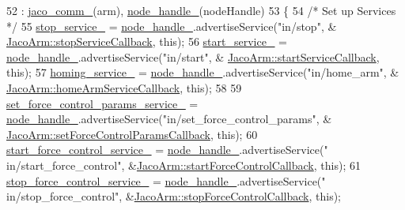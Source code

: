 \begin{DoxyCode}
52     : \hyperlink{classjaco_1_1JacoArm_a2f9cbba855994058b82c0f4628349286}{jaco\_comm\_}(arm), \hyperlink{classjaco_1_1JacoArm_aa8b6a99580f2ccf8a5c509cc0f3b3c8e}{node\_handle\_}(nodeHandle)
53 \{
54     \textcolor{comment}{/* Set up Services */}
55     \hyperlink{classjaco_1_1JacoArm_a43eca41486bfa5f012085d3bb02ac7ca}{stop\_service\_} = \hyperlink{classjaco_1_1JacoArm_aa8b6a99580f2ccf8a5c509cc0f3b3c8e}{node\_handle\_}.advertiseService(\textcolor{stringliteral}{"in/stop"}, &
      \hyperlink{classjaco_1_1JacoArm_a14ddcea579804fbbd3fb11643bc91e78}{JacoArm::stopServiceCallback}, \textcolor{keyword}{this});
56     \hyperlink{classjaco_1_1JacoArm_a7003937a11db04de838d05de05d29481}{start\_service\_} = \hyperlink{classjaco_1_1JacoArm_aa8b6a99580f2ccf8a5c509cc0f3b3c8e}{node\_handle\_}.advertiseService(\textcolor{stringliteral}{"in/start"}, &
      \hyperlink{classjaco_1_1JacoArm_a0b59f245a5ca363c52dcbc211f20fa64}{JacoArm::startServiceCallback}, \textcolor{keyword}{this});
57     \hyperlink{classjaco_1_1JacoArm_af025f6af7b63a3dd5ce18a31b082eec3}{homing\_service\_} = \hyperlink{classjaco_1_1JacoArm_aa8b6a99580f2ccf8a5c509cc0f3b3c8e}{node\_handle\_}.advertiseService(\textcolor{stringliteral}{"in/home\_arm"}, &
      \hyperlink{classjaco_1_1JacoArm_a0296802ee4994977c35532077dd28a44}{JacoArm::homeArmServiceCallback}, \textcolor{keyword}{this});
58 
59     \hyperlink{classjaco_1_1JacoArm_a65f6584b95beb04af852cba7d953fdc3}{set\_force\_control\_params\_service\_} = 
      \hyperlink{classjaco_1_1JacoArm_aa8b6a99580f2ccf8a5c509cc0f3b3c8e}{node\_handle\_}.advertiseService(\textcolor{stringliteral}{"in/set\_force\_control\_params"}, &
      \hyperlink{classjaco_1_1JacoArm_a7a5b8120d770ed6ab0bd4593213de712}{JacoArm::setForceControlParamsCallback}, \textcolor{keyword}{this});
60     \hyperlink{classjaco_1_1JacoArm_aaf2a407b08e3982c463bbcf364be2dfa}{start\_force\_control\_service\_} = \hyperlink{classjaco_1_1JacoArm_aa8b6a99580f2ccf8a5c509cc0f3b3c8e}{node\_handle\_}.advertiseService(\textcolor{stringliteral}{"
      in/start\_force\_control"}, &\hyperlink{classjaco_1_1JacoArm_a6c96a5dcf017d0b054048e7765cd3f38}{JacoArm::startForceControlCallback}, \textcolor{keyword}{this});
61     \hyperlink{classjaco_1_1JacoArm_af20526f276fc6708aacec52ca08ad189}{stop\_force\_control\_service\_} = \hyperlink{classjaco_1_1JacoArm_aa8b6a99580f2ccf8a5c509cc0f3b3c8e}{node\_handle\_}.advertiseService(\textcolor{stringliteral}{"
      in/stop\_force\_control"}, &\hyperlink{classjaco_1_1JacoArm_a0ddc9f2458a2c5e17e095b03b72699dc}{JacoArm::stopForceControlCallback}, \textcolor{keyword}{this});

\end{DoxyCode}
